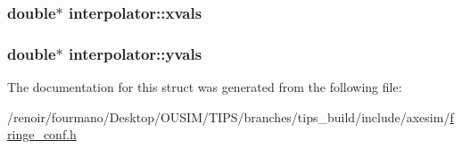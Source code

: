 \hypertarget{structinterpolator_a0114ddc19b1dd09d7920d11970e22a8e}{
\subsubsection[{xvals}]{\setlength{\rightskip}{0pt plus 5cm}double$\ast$ {\bf interpolator::xvals}}}
\label{structinterpolator_a0114ddc19b1dd09d7920d11970e22a8e}
\hypertarget{structinterpolator_a990b3a655c74b64fd02f04b5fc344ff0}{
\subsubsection[{yvals}]{\setlength{\rightskip}{0pt plus 5cm}double$\ast$ {\bf interpolator::yvals}}}
\label{structinterpolator_a990b3a655c74b64fd02f04b5fc344ff0}


The documentation for this struct was generated from the following file:\begin{DoxyCompactItemize}
\item 
/renoir/fourmano/Desktop/OUSIM/TIPS/branches/tips\_\-build/include/axesim/\hyperlink{fringe__conf_8h}{fringe\_\-conf.h}\end{DoxyCompactItemize}
